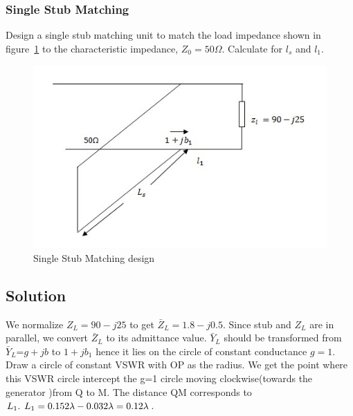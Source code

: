 \begin{exmp}
\subsubsection*{Single Stub Matching}
Design a single stub matching unit to match the load impedance shown in figure~\ref{fig:figw} to the characteristic impedance, $Z_0 = 50\varOmega$. Calculate for $l_s$ and $l_1$.
\begin{figure}[h]
\centering
\includegraphics[width=1\linewidth]{./graphics/figw}
\caption{Single Stub Matching design}
\label{fig:figw}
\end{figure}

\subsection*{Solution}
We normalize $Z_L=90-j25$ to get 
$\bar{Z}_L=1.8-j0.5$. Since stub and $Z_L$ are in parallel,
we convert $\bar{Z}_L$ to its admittance value. $\bar{Y}_{L}$
should be transformed from 
$\bar{Y}_{L}$=$g+jb$ to $1+jb_1$ hence it lies on the circle of constant conductance $g=1$. Draw a circle of constant VSWR with OP as the radius. We get the point where this VSWR circle intercept the g=1 circle moving clockwise(towards the generator )from Q to M. The distance QM corresponds to $L_1.\hspace{0.15cm} L_1=0.152\lambda-0.032\lambda=0.12\lambda$.


\end{exmp}
